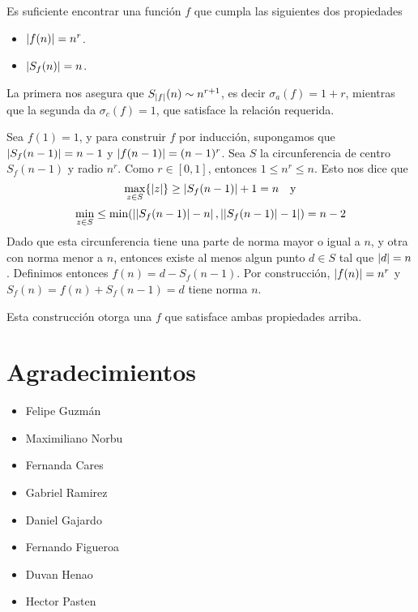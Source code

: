 \begin{sol}
    Es suficiente encontrar una funci\'on $f$ que cumpla las siguientes dos propiedades
    \begin{itemize}
        \item $\left|f(n)\right| = n^r$.
        \item $\left|S_f(n)\right| = n$.
    \end{itemize}
    La primera nos asegura que $S_{\left|f\right|}(n) \sim n^{r+1}$, es decir $\sigma_a(f) = 1+r$, mientras que la segunda da $\sigma_c(f) = 1$, que satisface la relación requerida.

    Sea $f(1) = 1$, y para construir $f$ por inducci\'on, supongamos que $\left|S_f(n-1)\right| = n-1$ y $\left|f(n-1)\right| = (n-1)^r$. Sea $S$ la circunferencia de centro $S_f(n-1)$ y radio $n^r$. Como $r \in [0,1]$, entonces $1 \leq n^r \leq n$. Esto nos dice que
    $$\max_{z \in S}\{\left|z\right|\} \geq \left|S_f(n-1)\right| + 1 = n\quad \text{y}$$
    $$\min_{z \in S} \leq \min(\left|\left|S_f(n-1)\right| - n\right|,\left|\left|S_f(n-1)\right| - 1\right|) = n-2$$
    Dado que esta circunferencia tiene una parte de norma mayor o igual a $n$, y otra con norma menor a $n$, entonces existe al menos algun punto $d \in S$ tal que $\left|d\right| = n$. Definimos entonces $f(n) = d - S_f(n-1)$. Por construcci\'on, $\left|f(n)\right| = n^r$ y $S_f(n) = f(n) + S_f(n-1) = d$ tiene norma $n$.

    Esta construcción otorga una $f$ que satisface ambas propiedades arriba.
\end{sol}

\section{Agradecimientos}
\begin{multicols}{3}
    \begin{itemize}
        \item Felipe Guzmán

        \item Maximiliano Norbu

        \item Fernanda Cares

        \item Gabriel Ramirez

        \item Daniel Gajardo

        \item Fernando Figueroa

        \item Duvan Henao

        \item Hector Pasten
    \end{itemize}
\end{multicols}





